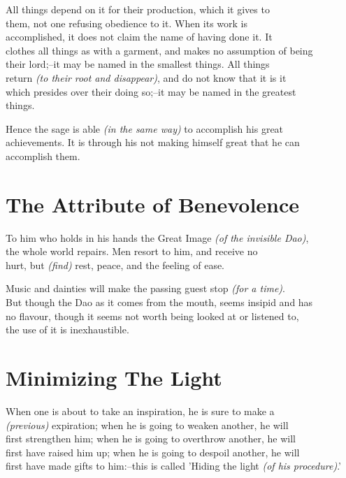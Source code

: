     
    All things depend on it for their production, which it gives to\\
    them, not one refusing obedience to it. When its work is\\
    accomplished, it does not claim the name of having done it. It\\
    clothes all things as with a garment, and makes no assumption of being\\
    their lord;--it may be named in the smallest things. All things\\
    return \textit{(to their root and disappear)}, and do not know that it is it\\
    which presides over their doing so;--it may be named in the greatest\\
    things.\vspace{\baselineskip}
    
    Hence the sage is able \textit{(in the same way)} to accomplish his great\\
    achievements. It is through his not making himself great that he can\\
    accomplish them.\vspace{\baselineskip}
    
\section*{The Attribute of Benevolence}
    To him who holds in his hands the Great Image \textit{(of the invisible Dao)},\\ 
    the whole world repairs. Men resort to him, and receive no\\
    hurt, but \textit{(find)} rest, peace, and the feeling of ease.\vspace{\baselineskip}
    
    Music and dainties will make the passing guest stop \textit{(for a time)}.\\
    But though the Dao as it comes from the mouth, seems insipid and has\\
    no flavour, though it seems not worth being looked at or listened to,\\
    the use of it is inexhaustible.\vspace{\baselineskip}
    
\section*{Minimizing The Light}
    When one is about to take an inspiration, he is sure to make a\\
    \textit{(previous)} expiration; when he is going to weaken another, he will\\
    first strengthen him; when he is going to overthrow another, he will\\
    first have raised him up; when he is going to despoil another, he will\\
    first have made gifts to him:--this is called 'Hiding the light \textit{(of his procedure)}.'\vspace{\baselineskip}
    
